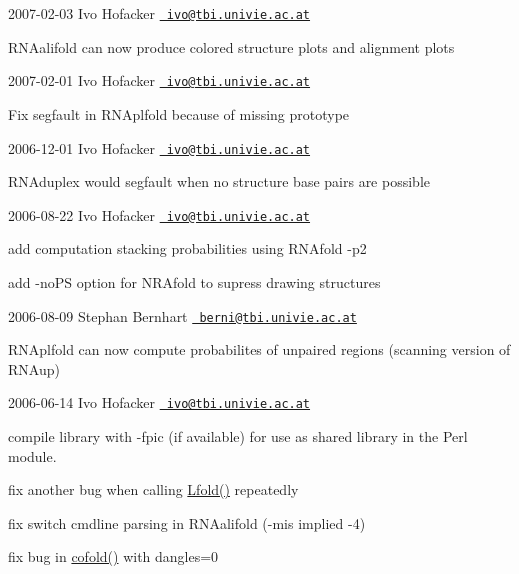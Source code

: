 2007-\/02-\/03 Ivo Hofacker \href{mailto:ivo@tbi.univie.ac.at}{\texttt{ ivo@tbi.\+univie.\+ac.\+at}}


\begin{DoxyItemize}
\item R\+N\+Aalifold can now produce colored structure plots and alignment plots
\end{DoxyItemize}

2007-\/02-\/01 Ivo Hofacker \href{mailto:ivo@tbi.univie.ac.at}{\texttt{ ivo@tbi.\+univie.\+ac.\+at}}


\begin{DoxyItemize}
\item Fix segfault in R\+N\+Aplfold because of missing prototype
\end{DoxyItemize}

2006-\/12-\/01 Ivo Hofacker \href{mailto:ivo@tbi.univie.ac.at}{\texttt{ ivo@tbi.\+univie.\+ac.\+at}}


\begin{DoxyItemize}
\item R\+N\+Aduplex would segfault when no structure base pairs are possible
\end{DoxyItemize}

2006-\/08-\/22 Ivo Hofacker \href{mailto:ivo@tbi.univie.ac.at}{\texttt{ ivo@tbi.\+univie.\+ac.\+at}}


\begin{DoxyItemize}
\item add computation stacking probabilities using R\+N\+Afold -\/p2
\item add -\/no\+PS option for N\+R\+Afold to supress drawing structures
\end{DoxyItemize}

2006-\/08-\/09 Stephan Bernhart \href{mailto:berni@tbi.univie.ac.at}{\texttt{ berni@tbi.\+univie.\+ac.\+at}}


\begin{DoxyItemize}
\item R\+N\+Aplfold can now compute probabilites of unpaired regions (scanning version of R\+N\+Aup)
\end{DoxyItemize}

2006-\/06-\/14 Ivo Hofacker \href{mailto:ivo@tbi.univie.ac.at}{\texttt{ ivo@tbi.\+univie.\+ac.\+at}}


\begin{DoxyItemize}
\item compile library with -\/fpic (if available) for use as shared library in the Perl module.
\item fix another bug when calling \mbox{\hyperlink{group__mfe__window__deprecated_gafdd1e11b5c7ad443b9f86b818e67bab4}{Lfold()}} repeatedly
\item fix switch cmdline parsing in R\+N\+Aalifold (-\/mis implied -\/4)
\item fix bug in \mbox{\hyperlink{group__mfe__global__deprecated_gabc8517f22cfe70595ee81fc837910d52}{cofold()}} with dangles=0
\end{DoxyItemize}

